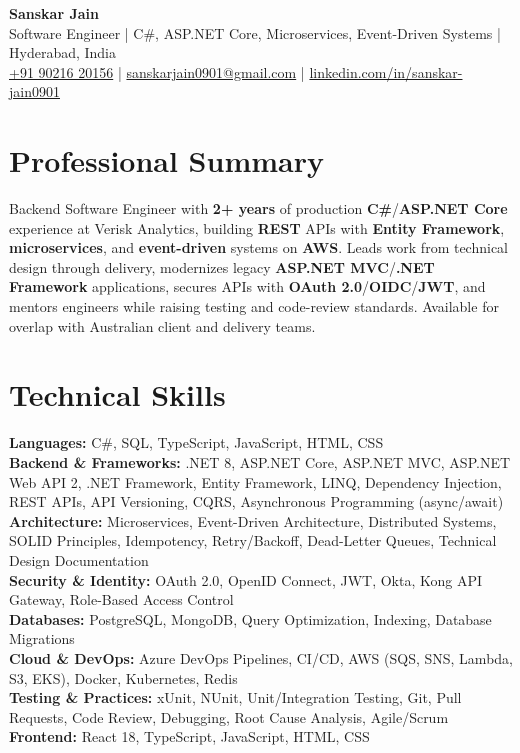 \documentclass[a4paper,10pt]{article}
\begin{document}
\begin{center}
    {\LARGE \textbf{Sanskar Jain}} \\
    \vspace{2pt}
    Software Engineer \;|\; C\#, ASP.NET Core, Microservices, Event-Driven Systems \;|\; Hyderabad, India \\
    \href{tel:+919021620156}{+91 90216 20156} \;|\;
    \href{mailto:sanskarjain0901@gmail.com}{sanskarjain0901@gmail.com} \;|\;
    \href{https://www.linkedin.com/in/sanskar-jain0901/}{linkedin.com/in/sanskar-jain0901}
\end{center}

\section*{Professional Summary}
Backend Software Engineer with \textbf{2+ years} of production \textbf{C\#}/\textbf{ASP.NET Core} experience at Verisk Analytics, building \textbf{REST} APIs with \textbf{Entity Framework}, \textbf{microservices}, and \textbf{event-driven} systems on \textbf{AWS}.
Leads work from technical design through delivery, modernizes legacy \textbf{ASP.NET MVC}/\textbf{.NET Framework} applications, secures APIs with \textbf{OAuth 2.0}/\textbf{OIDC}/\textbf{JWT}, and mentors engineers while raising testing and code-review standards. Available for overlap with Australian client and delivery teams.

\section*{Technical Skills}
\begin{sloppypar}
\noindent
\textbf{Languages:} C\#, SQL, TypeScript, JavaScript, HTML, CSS \\
\textbf{Backend \& Frameworks:} .NET 8, ASP.NET Core, ASP.NET MVC, ASP.NET Web API 2, .NET Framework, Entity Framework, LINQ, Dependency Injection, REST APIs, API Versioning, CQRS, Asynchronous Programming (async/await) \\
\textbf{Architecture:} Microservices, Event-Driven Architecture, Distributed Systems, SOLID Principles, Idempotency, Retry/Backoff, Dead-Letter Queues, Technical Design Documentation \\
\textbf{Security \& Identity:} OAuth 2.0, OpenID Connect, JWT, Okta, Kong API Gateway, Role-Based Access Control \\
\textbf{Databases:} PostgreSQL, MongoDB, Query Optimization, Indexing, Database Migrations \\
\textbf{Cloud \& DevOps:} Azure DevOps Pipelines, CI/CD, AWS (SQS, SNS, Lambda, S3, EKS), Docker, Kubernetes, Redis \\
\textbf{Testing \& Practices:} xUnit, NUnit, Unit/Integration Testing, Git, Pull Requests, Code Review, Debugging, Root Cause Analysis, Agile/Scrum \\
\textbf{Frontend:} React 18, TypeScript, JavaScript, HTML, CSS
\end{sloppypar}
\end{document}
